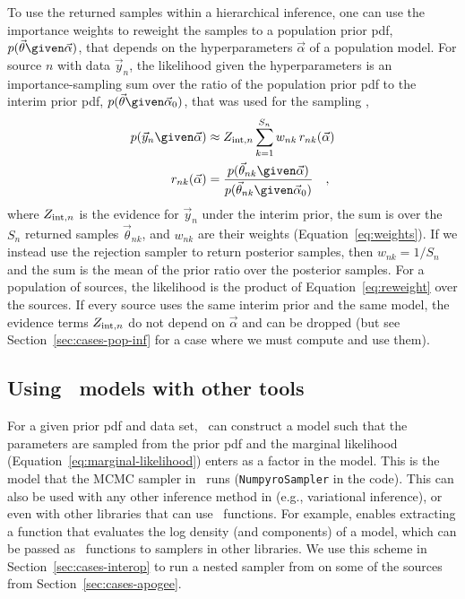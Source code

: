 \documentclass[twocolumn]{AASTeX7/aastex701}
\newcommand{\harv}{\package{harv}}
\begin{document}
To use the returned samples within a hierarchical inference, one can use the importance
weights to reweight the samples to a population prior pdf, $p(\vec{\theta} \given
\vec{\alpha})$, that depends on the hyperparameters $\vec{\alpha}$ of a population
model.
For source $n$ with data $\vec{y}_n$, the likelihood given the hyperparameters is an
importance-sampling sum over the ratio of the population prior pdf to the interim prior
pdf, $p(\vec{\theta} \given \vec{\alpha}_0)$, that was used for the sampling
\citep{Hogg:2010},
\begin{align}
  p(\vec{y}_n \given \vec{\alpha}) &\approx
    Z_{{\rm int},n} \sum_{k=1}^{S_n} w_{nk}\, r_{nk}(\vec{\alpha})
  \label{eq:reweight} \\
  r_{nk}(\vec{\alpha}) &=
    \frac{p(\vec{\theta}_{nk} \given \vec{\alpha})}
      {p(\vec{\theta}_{nk} \given \vec{\alpha}_0)}
  \quad ,
\end{align}
where $Z_{{\rm int},n}$ is the evidence for $\vec{y}_n$ under the interim prior, the sum
is over the $S_n$ returned samples $\vec{\theta}_{nk}$, and $w_{nk}$ are their weights
(Equation~\ref{eq:weights}).
If we instead use the rejection sampler to return posterior samples, then $w_{nk} =
1/S_n$ and the sum is the mean of the prior ratio over the posterior samples.
For a population of sources, the likelihood is the product of Equation~\ref{eq:reweight}
over the sources.
If every source uses the same interim prior and the same model, the evidence terms
$Z_{{\rm int},n}$ do not depend on $\vec{\alpha}$ and can be dropped (but see
Section~\ref{sec:cases-pop-inf} for a case where we must compute and use them).


\subsection{Using \harv\ models with other tools}
\label{sec:methods-interop}

For a given prior pdf and data set, \harv\ can construct a  model such
that the parameters are sampled from the prior pdf and the marginal likelihood
(Equation~\ref{eq:marginal-likelihood}) enters as a factor in the model.
This is the model that the MCMC sampler in \harv\ runs (\texttt{NumpyroSampler} in the
code).
This can also be used with any other inference method in  (e.g.,
variational inference), or even with other libraries that can use \jax\ functions.
For example,  enables extracting a function that evaluates the log
density (and components) of a model, which can be passed as \jax\ functions to samplers
in other libraries.
We use this scheme in Section~\ref{sec:cases-interop} to run a nested sampler from
 \citep{Cabezas:2024} on some of the sources from
Section~\ref{sec:cases-apogee}.
\end{document}
